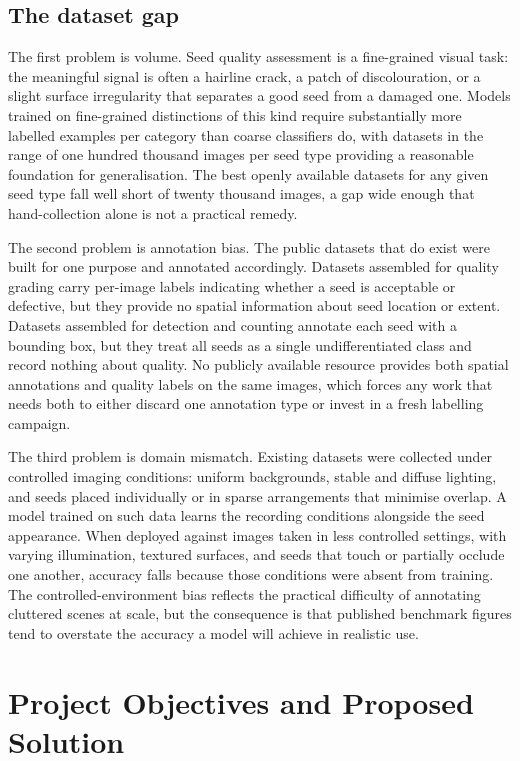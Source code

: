 \subsection{The dataset gap}

The first problem is volume. Seed quality assessment is a fine-grained visual
task: the meaningful signal is often a hairline crack, a patch of discolouration,
or a slight surface irregularity that separates a good seed from a damaged one.
Models trained on fine-grained distinctions of this kind require substantially
more labelled examples per category than coarse classifiers do, with datasets in
the range of one hundred thousand images per seed type providing a reasonable
foundation for generalisation. The best openly available datasets for any given
seed type fall well short of twenty thousand images, a gap wide enough that
hand-collection alone is not a practical remedy.

The second problem is annotation bias. The public datasets that do exist were
built for one purpose and annotated accordingly. Datasets assembled for quality
grading carry per-image labels indicating whether a seed is acceptable or
defective, but they provide no spatial information about seed location or extent.
Datasets assembled for detection and counting annotate each seed with a bounding
box, but they treat all seeds as a single undifferentiated class and record
nothing about quality. No publicly available resource provides both spatial
annotations and quality labels on the same images, which forces any work that
needs both to either discard one annotation type or invest in a fresh labelling
campaign.

The third problem is domain mismatch. Existing datasets were collected under
controlled imaging conditions: uniform backgrounds, stable and diffuse lighting,
and seeds placed individually or in sparse arrangements that minimise overlap.
A model trained on such data learns the recording conditions alongside the seed
appearance. When deployed against images taken in less controlled settings, with
varying illumination, textured surfaces, and seeds that touch or partially occlude
one another, accuracy falls because those conditions were absent from training.
The controlled-environment bias reflects the practical difficulty of annotating
cluttered scenes at scale, but the consequence is that published benchmark figures
tend to overstate the accuracy a model will achieve in realistic use.

\section{Project Objectives and Proposed Solution}


